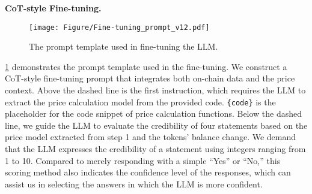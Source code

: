 \noindent
\textbf{CoT-style Fine-tuning.}
\begin{figure}[!t]
    \centering
    \texttt{[image: Figure/Fine-tuning\_prompt\_v12.pdf]}
    \vspace{-1ex}
    \caption{The prompt template used in fine-tuning the LLM.}
    \label{fig:fine-tuning_prompt}
\end{figure}
\myfig\ref{fig:fine-tuning_prompt} demonstrates the prompt template used in the fine-tuning.
We construct a CoT-style fine-tuning prompt that integrates both on-chain data and the price context.
Above the dashed line is the first instruction, which requires the LLM to extract the price calculation model from the provided code.
\texttt{\{code\}} is the placeholder for the code snippet of price calculation functions.
Below the dashed line, we guide the LLM to evaluate the credibility of four statements based on the price model extracted from step 1 and the tokens' balance change.
We demand that the LLM expresses the credibility of a statement using integers ranging from 1 to 10.
Compared to merely responding with a simple ``Yes'' or ``No,'' this scoring method also indicates the confidence level of the responses, which can assist us in selecting the answers in which the LLM is more confident.


